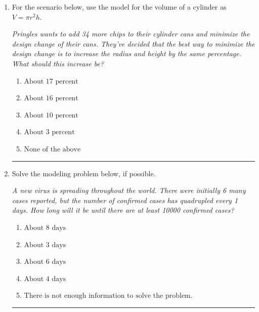 \documentclass[14pt]{extbook}
\newcommand{\litem}[1]{\item#1\hspace*{-1cm}\rule{\textwidth}{0.4pt}}
\begin{document}
\begin{enumerate}
{\begin{enumerate}[label=\Alph*.]
\end{enumerate} }
\litem{
For the scenario below, use the model for the volume of a cylinder as $V = \pi r^2 h$.
\begin{center}
    \textit{ Pringles wants to add 34 \text{percent} more chips to their cylinder cans and minimize the design change of their cans. They've decided that the best way to minimize the design change is to increase the radius and height by the same percentage. What should this increase be? }
\end{center}
\begin{enumerate}[label=\Alph*.]
\item \( \text{About } 17 \text{ percent} \)
\item \( \text{About } 16 \text{ percent} \)
\item \( \text{About } 10 \text{ percent} \)
\item \( \text{About } 3 \text{ percent} \)
\item \( \text{None of the above} \)

\end{enumerate} }
\litem{
Solve the modeling problem below, if possible.
\begin{center}
    \textit{ A new virus is spreading throughout the world. There were initially 6 many cases reported, but the number of confirmed cases has quadrupled every 1 days. How long will it be until there are at least 10000 confirmed cases? }
\end{center}
\begin{enumerate}[label=\Alph*.]
\item \( \text{About } 8 \text{ days} \)
\item \( \text{About } 3 \text{ days} \)
\item \( \text{About } 6 \text{ days} \)
\item \( \text{About } 4 \text{ days} \)
\item \( \text{There is not enough information to solve the problem.} \)


\end{enumerate}}
\end{enumerate}
\end{document}
